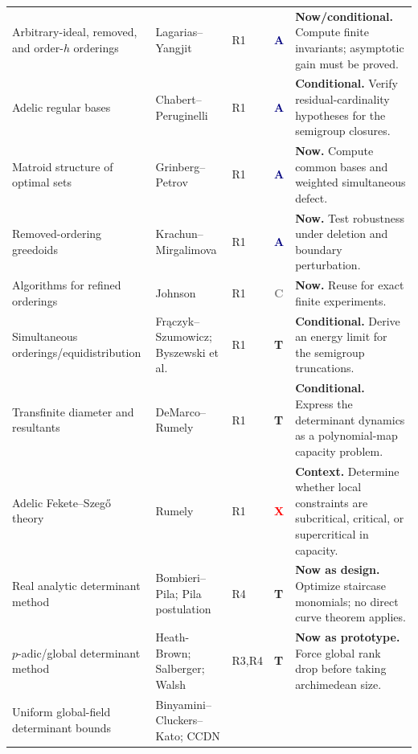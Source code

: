 \documentclass[10pt,letterpaper]{article}
\newcommand{\Rone}{\textsf{R1}}
\newcommand{\Rthree}{\textsf{R3}}
\newcommand{\Rfour}{\textsf{R4}}
\newcommand{\badgeAdapt}{\textcolor{navy}{\textbf{A}}}
\newcommand{\badgeTemplate}{\textcolor{amber}{\textbf{T}}}
\newcommand{\badgeDiagnostic}{\textcolor{red}{\textbf{X}}}
\newcommand{\badgeCompute}{\textcolor{graytext}{\textbf{C}}}
\begin{document}
\begin{longtable}{@{}L{0.225\textwidth}L{0.275\textwidth}C{0.08\textwidth}C{0.065\textwidth}L{0.30\textwidth}@{}}
Arbitrary-ideal, removed, and order-\(h\) orderings & Lagarias--Yangjit
\cite{LagariasYangjit2025} & \Rone & \badgeAdapt & \textbf{Now/conditional.} Compute finite
invariants; asymptotic gain must be proved.\\
\addlinespace
Adelic regular bases & Chabert--Peruginelli \cite{ChabertPeruginelli} & \Rone &
\badgeAdapt & \textbf{Conditional.} Verify residual-cardinality hypotheses for the semigroup
closures.\\
\addlinespace
Matroid structure of optimal sets & Grinberg--Petrov \cite{GrinbergPetrov} & \Rone &
\badgeAdapt & \textbf{Now.} Compute common bases and weighted simultaneous defect.\\
\addlinespace
Removed-ordering greedoids & Krachun--Mirgalimova \cite{KrachunMirgalimova} & \Rone &
\badgeAdapt & \textbf{Now.} Test robustness under deletion and boundary perturbation.\\
\addlinespace
Algorithms for refined orderings & Johnson \cite{Johnson2010} & \Rone & \badgeCompute &
\textbf{Now.} Reuse for exact finite experiments.\\
\addlinespace
Simultaneous orderings/equidistribution & Fr\k{a}czyk--Szumowicz; Byszewski et al.
\cite{FraczykSzumowicz,ByszewskiFraczykSzumowicz,SimultaneousOrderings2022} & \Rone &
\badgeTemplate & \textbf{Conditional.} Derive an energy limit for the semigroup truncations.\\
\addlinespace
Transfinite diameter and resultants & DeMarco--Rumely \cite{DeMarcoRumely} & \Rone &
\badgeTemplate & \textbf{Conditional.} Express the determinant dynamics as a polynomial-map
capacity problem.\\
\addlinespace
Adelic Fekete--Szeg\H{o} theory & Rumely \cite{RumelyFeketeSzego} & \Rone &
\badgeDiagnostic & \textbf{Context.} Determine whether local constraints are subcritical,
critical, or supercritical in capacity.\\
\addlinespace
Real analytic determinant method & Bombieri--Pila; Pila postulation
\cite{BombieriPila,PilaPostulation} & \Rfour & \badgeTemplate & \textbf{Now as design.}
Optimize staircase monomials; no direct curve theorem applies.\\
\addlinespace
\(p\)-adic/global determinant method & Heath-Brown; Salberger; Walsh
\cite{HeathBrown2002,Salberger2007,Walsh2015} & \Rthree,\Rfour & \badgeTemplate &
\textbf{Now as prototype.} Force global rank drop before taking archimedean size.\\
\addlinespace
Uniform global-field determinant bounds & Binyamini--Cluckers--Kato; CCDN

\end{longtable}
\end{document}
